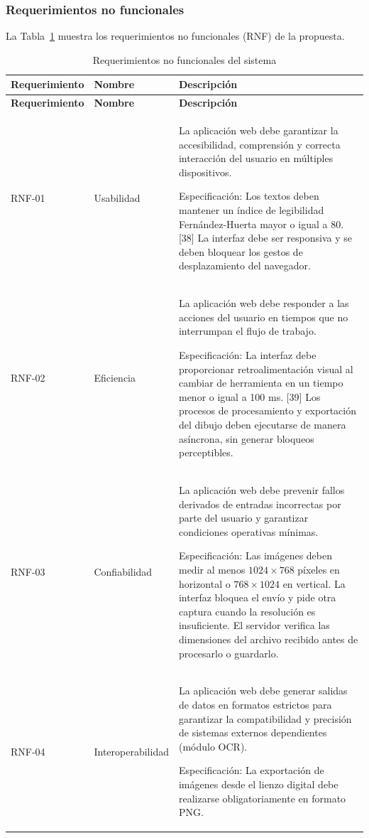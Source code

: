\subsubsection{Requerimientos no funcionales}

La Tabla~\ref{tab:rnf} muestra los requerimientos no funcionales (RNF) de la propuesta.

\begin{longtable}{|p{3.2cm}|p{3.8cm}|p{8.2cm}|}
\caption{Requerimientos no funcionales del sistema} \label{tab:rnf} \\ \hline

\textbf{Requerimiento} & \textbf{Nombre} & \textbf{Descripción} \\ \hline
\endfirsthead

\hline
\textbf{Requerimiento} & \textbf{Nombre} & \textbf{Descripción} \\ \hline
\endhead

RNF-01 &
Usabilidad &
La aplicación web debe garantizar la accesibilidad, comprensión y correcta interacción del usuario en múltiples dispositivos.

Especificación: Los textos deben mantener un índice de legibilidad Fernández-Huerta mayor o igual a 80. [38] La interfaz debe ser responsiva y se deben bloquear los gestos de desplazamiento del navegador.
\\ \hline

RNF-02 &
Eficiencia &
La aplicación web debe responder a las acciones del usuario en tiempos que no interrumpan el flujo de trabajo.

Especificación: La interfaz debe proporcionar retroalimentación visual al cambiar de herramienta en un tiempo menor o igual a 100 ms. [39] Los procesos de procesamiento y exportación del dibujo deben ejecutarse de manera asíncrona, sin generar bloqueos perceptibles.
\\ \hline

RNF-03 &
Confiabilidad &
La aplicación web debe prevenir fallos derivados de entradas incorrectas por parte del usuario y garantizar condiciones operativas mínimas.

Especificación: Las imágenes deben medir al menos $1024 \times 768$ píxeles en horizontal o $768 \times 1024$ en vertical. La interfaz bloquea el envío y pide otra captura cuando la resolución es insuficiente. El servidor verifica las dimensiones del archivo recibido antes de procesarlo o guardarlo.
\\ \hline

RNF-04 &
Interoperabilidad &
La aplicación web debe generar salidas de datos en formatos estrictos para garantizar la compatibilidad y precisión de sistemas externos dependientes (módulo OCR).

Especificación: La exportación de imágenes desde el lienzo digital debe realizarse obligatoriamente en formato PNG.
\\ \hline
\end{longtable}
